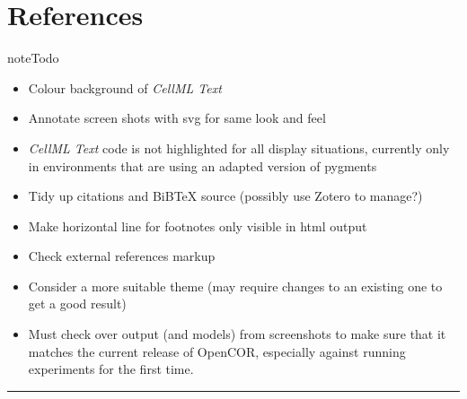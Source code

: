 \documentclass[a4paper,10pt,english]{sphinxmanual}
\begin{document}
\chapter{References}
\label{zreferences::doc}\label{zreferences:references}


\begin{notice}{note}{Todo}
\begin{itemize}
\item {} 
Colour background of \emph{CellML Text}

\item {} 
Annotate screen shots with svg for same look and feel

\item {} 
\emph{CellML Text} code is not highlighted for all display situations, currently only in environments that are using an adapted version of pygments

\item {} 
Tidy up citations and BiBTeX source (possibly use Zotero to manage?)

\item {} 
Make horizontal line for footnotes only visible in html output

\item {} 
Check external references markup

\item {} 
Consider a more suitable theme (may require changes to an existing one to get a good result)

\item {} 
Must check over output (and models) from screenshots to make sure that it matches the current release of OpenCOR, especially against running experiments for the first time.

\end{itemize}
\end{notice}


\bigskip\hrule{}\bigskip
\end{document}

